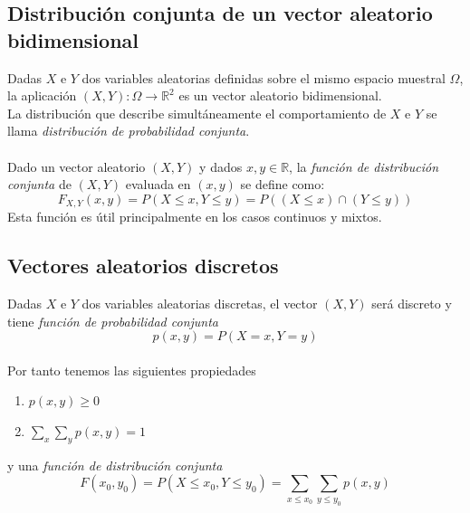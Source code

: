 \documentclass{article}
\begin{document}
\subsection{Distribución conjunta de un vector aleatorio bidimensional}

Dadas \(X\) e \(Y\) dos variables aleatorias definidas sobre el mismo espacio muestral
\(\Omega\), la \qquad aplicación \((X,Y):\Omega \to \mathbb{R}^2\) es un vector
aleatorio bidimensional. \\
La distribución que describe simultáneamente el comportamiento de \(X\) e \(Y\) se 
llama \textit{distribución de probabilidad conjunta}. \\ \\
Dado un vector aleatorio \((X, Y)\) y dados \(x,y \in \mathbb{R}\), la \textit{función
de distribución conjunta} de \((X, Y)\) evaluada en \((x, y)\) se define como:
\[F_{X, Y}(x, y) = P(X \leq x, Y \leq y) = P((X \leq x) \cap (Y \leq y))\]
Esta función es útil principalmente en los casos continuos y mixtos.

\subsection{Vectores aleatorios discretos}

Dadas \(X\) e \(Y\) dos variables aleatorias discretas, el vector \((X, Y)\) será 
discreto y tiene \textit{función de probabilidad conjunta} 
\[p(x, y) = P(X = x, Y = y)\] \\
Por tanto tenemos las siguientes propiedades
\begin{enumerate}
    \item \(p(x, y) \geq 0\)
    \item \(\sum_{x}\sum_{y} p(x, y) = 1\)
\end{enumerate}
y una \textit{función de distribución conjunta}
\[F(x_{0}, y_{0}) = P(X \leq x_0, Y \leq y_0) = \sum_{x \leq x_0} \sum_{y \leq y_0} p(x, y)\]

\newpage
\end{document}
